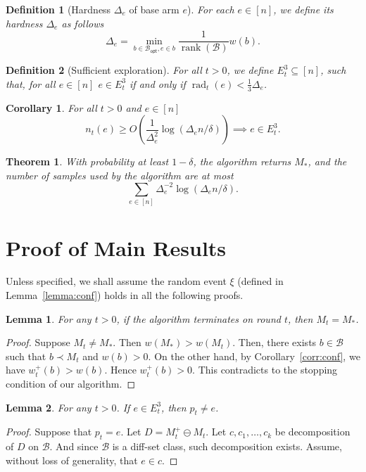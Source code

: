\documentclass{article}
\newtheorem{define}{Definition}
\newtheorem{lemma}{Lemma}
\newtheorem{corollary}{Corollary}
\newtheorem{theorem}{Theorem}
\newcommand{\diffvalid}{\prec}
\newcommand{\B}{\mathcal B}
\newcommand{\Bopt}{\mathcal B_{\mathsf{opt}}}
\DeclareMathOperator{\rank}{rank}
\DeclareMathOperator{\rad}{rad}
\begin{document}
\begin{spacing}{1.1}
\begin{define}[Hardness $\Delta_e$ of base arm $e$]
For each $e\in [n]$, we define its hardness $\Delta_e$ as follows
$$
\Delta_e = \min_{b\in \Bopt, e\in b} \frac{1}{\rank(\B)} w(b).
$$
\end{define}

\begin{define}[Sufficient exploration]
For all $t>0$, we define $E_t^3 \subseteq [n]$, such that, for all $e\in[n]$
$e\in E_t^3$ if and only if $\rad_t(e) < \frac{1}{3} \Delta_e$.
\end{define}

\begin{corollary}
For all $t>0$ and $e\in[n]$
$$ n_t(e) \ge O(\frac{1}{\Delta_e^2}\log(\Delta_e n/\delta)) \implies e\in E_t^3.$$
\end{corollary}

\begin{theorem}
With probability at least $1-\delta$,
the algorithm returns $M_*$,
and the number of samples used by the algorithm are at most
$$
\sum_{e\in [n]} \Delta_e^{-2}\log(\Delta_e n/\delta).
$$
\end{theorem}


\section{Proof of Main Results}
Unless specified, we shall assume the random event $\xi$ (defined in Lemma~\ref{lemma:conf}) holds in all the following proofs.


\begin{lemma}
\label{lemma:correct}
For any $t>0$, if the algorithm terminates on round $t$, then $M_t=M_*$.
\end{lemma}

\begin{proof}
Suppose $M_t \not= M_*$. Then $w(M_*)>w(M_t)$. 
Then, there exists $b \in \B$ such that $b \diffvalid M_t$ and $w(b)>0$.
On the other hand, by Corollary~\ref{corr:conf}, we have $w_t^+(b) > w(b)$.
Hence $w_t^+(b)>0$. This contradicts to the stopping condition of our algorithm.
\end{proof}

\begin{lemma}
For any $t>0$.
If $e\in E_t^3$, then $p_t\not= e$.
\end{lemma}

\begin{proof}
Suppose that $p_t=e$. 
Let $D = M_t^+ \ominus M_t$.
Let $c,c_1,\ldots,c_k$ be decomposition of $D$ on $\B$. 
And since $\B$ is a diff-set class, such decomposition exists.
Assume, without loss of generality, that $e\in c$.


\end{proof}
\end{spacing}
\end{document}
